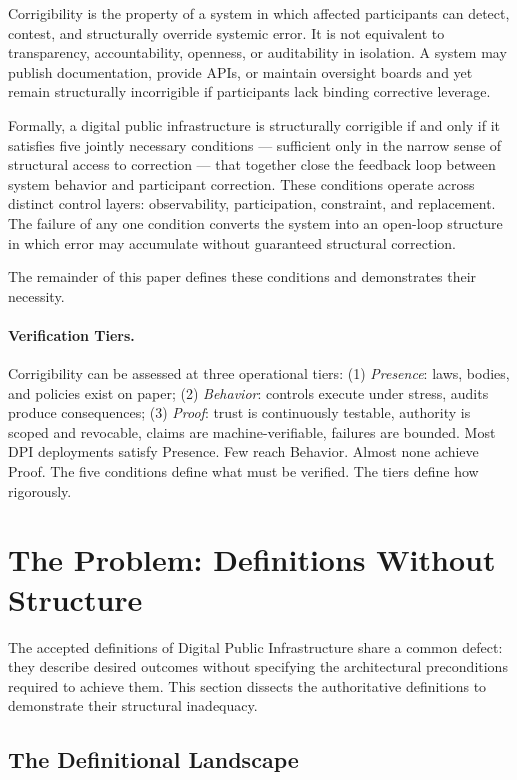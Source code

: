 \documentclass{article}
\begin{document}
Corrigibility is the property of a system in which affected participants can detect, contest, and structurally override systemic error. It is not equivalent to transparency, accountability, openness, or auditability in isolation. A system may publish documentation, provide APIs, or maintain oversight boards and yet remain structurally incorrigible if participants lack binding corrective leverage.

Formally, a digital public infrastructure is structurally corrigible if and only if it satisfies five jointly necessary conditions --- sufficient only in the narrow sense of structural access to correction --- that together close the feedback loop between system behavior and participant correction. These conditions operate across distinct control layers: observability, participation, constraint, and replacement. The failure of any one condition converts the system into an open-loop structure in which error may accumulate without guaranteed structural correction.

The remainder of this paper defines these conditions and demonstrates their necessity.

\paragraph{Verification Tiers.} Corrigibility can be assessed at three operational tiers: (1) \textit{Presence}: laws, bodies, and policies exist on paper; (2) \textit{Behavior}: controls execute under stress, audits produce consequences; (3) \textit{Proof}: trust is continuously testable, authority is scoped and revocable, claims are machine-verifiable, failures are bounded. Most DPI deployments satisfy Presence. Few reach Behavior. Almost none achieve Proof. The five conditions define what must be verified. The tiers define how rigorously.

\section{The Problem: Definitions Without Structure}
\label{sec:problem}

The accepted definitions of Digital Public Infrastructure share a common defect: they describe desired outcomes without specifying the architectural preconditions required to achieve them. This section dissects the authoritative definitions to demonstrate their structural inadequacy.

\subsection{The Definitional Landscape}
\end{document}
